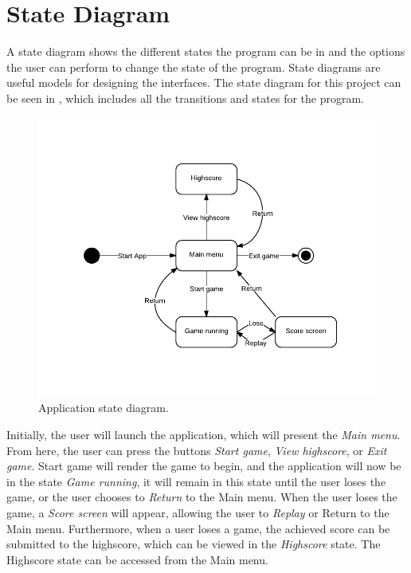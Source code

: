 \section{State Diagram}\label{section:state-diagram}

A state diagram shows the different states the program can be in and the options the user can perform to change the state of the program.
State diagrams are useful models for designing the interfaces. 
The state diagram for this project can be seen in , which includes all the transitions and states for the program. 

\begin{figure}[h]
	\centering
	\includegraphics[trim = 0cm 1.5cm 0cm 1.5cm, clip, scale = 1]{media/design/state-diagram.pdf}
	\caption{Application state diagram.}
	\label{figure:state-diagram}
\end{figure}

Initially, the user will launch the application, which will present the \textit{Main menu}.
From here, the user can press the buttons \textit{Start game}, \textit{View highscore}, or \textit{Exit game}. 
Start game will render the game to begin, and the application will now be in the state \textit{Game running}, it will remain in this state until the user loses the game, or the user chooses to \textit{Return} to the Main menu.
When the user loses the game, a \textit{Score screen} will appear, allowing the user to \textit{Replay} or Return to the Main menu. 
Furthermore, when a user loses a game, the achieved score can be submitted to the highscore, which can be viewed in the \textit{Highscore} state.
The Highscore state can be accessed from the Main menu.